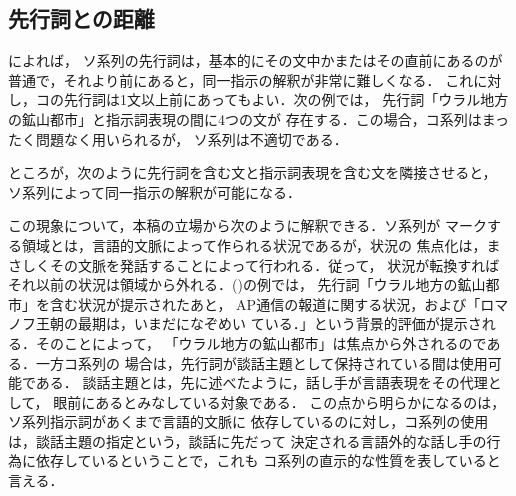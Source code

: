 \subsection{先行詞との距離}
によれば，
ソ系列の先行詞は，基本的にその文中かまたはその直前にあるのが
普通で，それより前にあると，同一指示の解釈が非常に難しくなる．
これに対し，コの先行詞は1文以上前にあってもよい．次の例では，
先行詞「ウラル地方の鉱山都市」と指示詞表現の間に4つの文が
存在する．この場合，コ系列はまったく問題なく用いられるが，
ソ系列は不適切である．


ところが，次のように先行詞を含む文と指示詞表現を含む文を隣接させると，
ソ系列によって同一指示の解釈が可能になる．


この現象について，本稿の立場から次のように解釈できる．ソ系列が
マークする領域とは，言語的文脈によって作られる状況であるが，状況の
焦点化は，まさしくその文脈を発話することによって行われる．従って，
状況が転換すればそれ以前の状況は領域から外れる．()の例では，
先行詞「ウラル地方の鉱山都市」を含む状況が提示されたあと，
AP通信の報道に関する状況，および「ロマノフ王朝の最期は，いまだになぞめい
ている．」という背景的評価が提示される．そのことによって，
「ウラル地方の鉱山都市」は焦点から外されるのである．一方コ系列の
場合は，先行詞が談話主題として保持されている間は使用可能である．
談話主題とは，先に述べたように，話し手が言語表現をその代理として，
眼前にあるとみなしている対象である．
この点から明らかになるのは，ソ系列指示詞があくまで言語的文脈に
依存しているのに対し，コ系列の使用は，談話主題の指定という，談話に先だって
決定される言語外的な話し手の行為に依存しているということで，これも
コ系列の直示的な性質を表していると言える．

